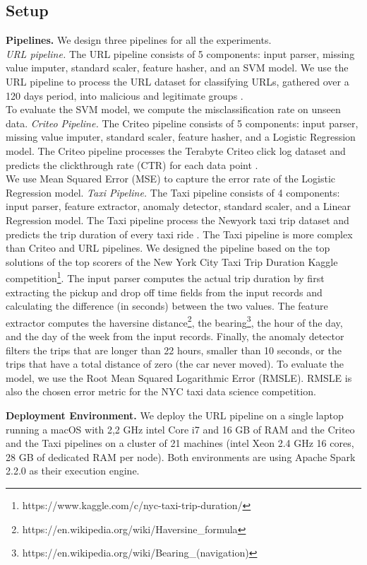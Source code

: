 \subsection{Setup}\label{subsec:setup}
\textbf{Pipelines.}
We design three pipelines for all the experiments.\\
\textit{URL pipeline. } The URL pipeline consists of 5 components: input parser, missing value imputer, standard scaler, feature hasher, and an SVM model.
We use the URL pipeline to process the URL dataset for classifying URLs, gathered over a 120 days period, into malicious and legitimate groups \cite{ma2009identifying}.\\
To evaluate the SVM model, we compute the misclassification rate on unseen data.
\textit{Criteo Pipeline.} 
The Criteo pipeline consists of 5 components: input parser, missing value imputer, standard scaler, feature hasher, and a Logistic Regression model.
The Criteo pipeline processes the Terabyte Criteo click log dataset and predicts the clickthrough rate (CTR) for each data point \cite{criteo-log}.\\
We use Mean Squared Error (MSE) to capture the error rate of the Logistic Regression model.
\textit{Taxi Pipeline.}
The Taxi pipeline consists of 4 components: input parser, feature extractor, anomaly detector, standard scaler, and a Linear Regression model.
The Taxi pipeline process the Newyork taxi trip dataset and predicts the trip duration of every taxi ride \cite{newyork-taxi}. The Taxi pipeline is more complex than Criteo and URL pipelines. We designed the pipeline based on the top solutions of the top scorers of the New York City Taxi Trip Duration Kaggle competition\footnote{https://www.kaggle.com/c/nyc-taxi-trip-duration/}. The input parser computes the actual trip duration by first extracting the pickup and drop off time fields from the input records and calculating the difference (in seconds) between the two values.
The feature extractor computes the haversine distance\footnote{https://en.wikipedia.org/wiki/Haversine\_formula}, the bearing\footnote{https://en.wikipedia.org/wiki/Bearing\_(navigation)}, the hour of the day, and the day of the week from the input records. Finally, the anomaly detector filters the trips that are longer than 22 hours, smaller than 10 seconds, or the trips that have a total distance of zero (the car never moved). 
To evaluate the model, we use the Root Mean Squared Logarithmic Error (RMSLE).
RMSLE is also the chosen error metric for the NYC taxi data science competition.

\textbf{Deployment Environment. }
We deploy the URL pipeline on a single laptop running a macOS with 2,2 GHz intel Core i7 and 16 GB of RAM and the Criteo and the Taxi pipelines on a cluster of 21 machines (intel Xeon 2.4 GHz 16 cores, 28 GB of dedicated RAM per node).
Both environments are using Apache Spark 2.2.0 as their execution engine.

